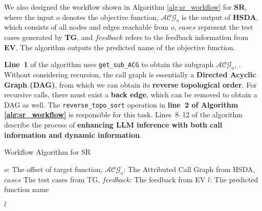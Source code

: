 \documentclass[acmsmall,screen,review,anonymous]{acmart} %
\begin{document}
We also designed the workflow shown in Algorithm \ref{alg:sr_workflow} for \textbf{SR}, where the input $o$ denotes the objective function, $\mathcal{ACG}_o$ is the output of \textbf{HSDA}, which consists of all nodes and edges reachable from $o$, $cases$ represent the test cases generated by \textbf{TG}, and $feedback$ refers to the feedback information from \textbf{EV}. The algorithm outputs the predicted name of the objective function.

\textbf{Line~1} of the algorithm uses \texttt{get\_sub\_ACG} to obtain the subgraph ${\mathcal{ACG}_o}$, . Without considering recursion, the call graph is essentially a \textbf{Directed Acyclic Graph (DAG)}, from which we can obtain its \textbf{reverse topological order}. For recursive calls, there must exist a \textbf{back edge}, which can be removed to obtain a DAG as well. The \texttt{reverse\_topo\_sort} operation in \textbf{line~2 of Algorithm \ref{alg:sr_workflow}} is responsible for this task. Lines~8--12 of the algorithm describe the process of \textbf{enhancing LLM inference with both call information and dynamic information}.



\begin{algorithm}
  \caption{Workflow Algorithm for SR}
  \label{alg:sr_workflow}
  \begin{algorithmic}[1]
    \REQUIRE $o$: The offset of target function, $\mathcal{ACG}_o$: The Attributed Call Graph from HSDA, $cases$ The test cases from TG, $feedback$: The feedback from EV
    \ENSURE $l$: The predicted function name


        \ELSE
            \ENDIF
        \ENDIF
    \ENDFOR
    \RETURN $l$
  \end{algorithmic}
\end{algorithm}
\end{document}
